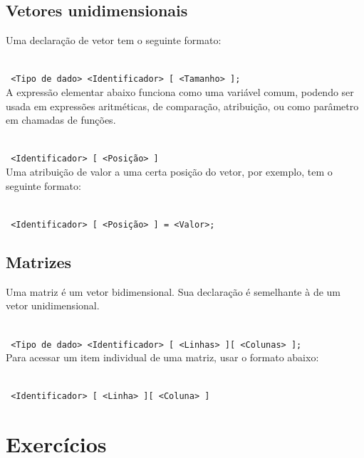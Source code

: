 \documentclass{book}
\newcommand{\NEWLINE}{~\\}
\begin{document}
\section{Vetores unidimensionais}

Uma declaração de vetor tem o seguinte formato:

\NEWLINE
{\tt
<Tipo de dado> <Identificador> [ <Tamanho> ];
}
\NEWLINE

A expressão elementar abaixo funciona como uma variável comum, podendo ser usada em expressões aritméticas, de comparação, atribuição, ou como parâmetro em chamadas de funções.

\NEWLINE
{\tt
<Identificador> [ <Posição> ]
}
\NEWLINE

Uma atribuição de valor a uma certa posição do vetor, por exemplo, tem o seguinte formato:

\NEWLINE
{\tt
<Identificador> [ <Posição> ] = <Valor>;
}
\NEWLINE


\section{Matrizes}

Uma matriz é um vetor bidimensional. Sua declaração é semelhante à de um vetor unidimensional.

\NEWLINE
{\tt
<Tipo de dado> <Identificador> [ <Linhas> ][ <Colunas> ];
}
\NEWLINE


Para acessar um item individual de uma matriz, usar o formato abaixo:

\NEWLINE
{\tt
<Identificador> [ <Linha> ][ <Coluna> ]
}
\NEWLINE



\chapter{Exercícios}

\setcounter{iQuest}{0}

\newcommand{\quest}{%
\addtocounter{iQuest}{1}%
\arabic{iQuest}}

\newcommand{\zeraquest}{%
\setcounter{iQuest}{0}}


\end{document}
